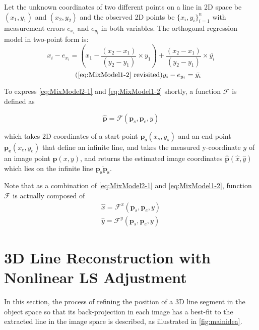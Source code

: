 Let the unknown coordinates of two different points on a line in 2D space be $(x_1,y_1)$ and $(x_2,y_2)$ and the observed 2D points be $\{x_i,y_i\}^n_{i=1}$ with measurement errors $e_{x_i}$ and $e_{y_i}$ in both variables. The orthogonal regression model in two-point form is: 
\begin{equation} \label{eq:MixModel2-1}
x_i - e_{x_i}= (x_1-\dfrac{(x_2-x_1)}{(y_2-y_1)}\times y_1) + \dfrac{(x_2-x_1)}{(y_2-y_1)}\times \bar{y_i}
\end{equation}
\begin{equation} \tag{\ref{eq:MixModel1-2} revisited}
y_i-e_{y_i} = \bar{y_i}
\end{equation}

To express \eqref{eq:MixModel2-1} and \eqref{eq:MixModel1-2} shortly, a function $\mathcal{F}$ is defined as

\begin{equation} \label{eq:Ffunction}
\hat{\mathbf{p}} = \mathcal{F}(\mathbf{p}_s,\mathbf{p}_e,y)
\end{equation}

which takes 2D coordinates of a start-point $\mathbf{p_s}(x_s,y_s)$ and an end-point $\mathbf{p_e}(x_e,y_e)$ that define an infinite line, and takes the measured y-coordinate $y$ of an image point $\mathbf{p}(x,y)$, and returns the estimated image coordinates $\mathbf{\hat{p}}(\hat{x},\hat{y})$ which lies on the infinite line $\overline{\mathbf{p_s}\mathbf{p_s}}$.

Note that as a combination of \eqref{eq:MixModel2-1} and \eqref{eq:MixModel1-2}, function $\mathcal{F}$ is actually composed of
\begin{equation} \label{eq:Ffunction_xy}
\begin{split}
\hat{x} = \mathcal{F}^x(\mathbf{p}_s,\mathbf{p}_e,y)\\
\hat{y} = \mathcal{F}^y(\mathbf{p}_s,\mathbf{p}_e,y)
\end{split}
\end{equation}

\clearpage
\section{3D Line Reconstruction with Nonlinear LS Adjustment}
\label{sec:LSadj}

In this section, the process of refining the position of a 3D line segment in the object space so that its back-projection in each image has a best-fit to the extracted line in the image space is described, as illustrated in \cref{fig:mainidea}.

